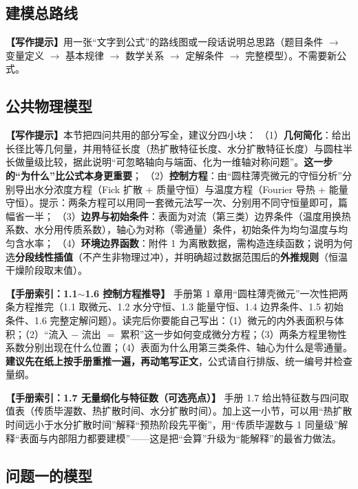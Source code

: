 \documentclass[12pt,a4paper]{article}
\newcommand{\prompt}[1]{\par\noindent\textbf{【写作提示】}#1\par}      %
\newcommand{\handbook}[2]{\par\noindent\textbf{【手册索引：#1】} #2\par}
\begin{document}
\subsection{建模总路线}

\prompt{用一张“文字到公式”的路线图或一段话说明总思路（题目条件 $\rightarrow$ 变量定义 $\rightarrow$ 基本规律 $\rightarrow$ 数学关系 $\rightarrow$ 定解条件 $\rightarrow$ 完整模型）。不需要新公式。}

\subsection{公共物理模型}

\prompt{本节把四问共用的部分写全，建议分四小块：
（1）\textbf{几何简化}：给出长径比等几何量，并用特征长度（热扩散特征长度、水分扩散特征长度）与圆柱半长做量级比较，据此说明“可忽略轴向与端面、化为一维轴对称问题”。\textbf{这一步的“为什么”比公式本身更重要}；
（2）\textbf{控制方程}：由“圆柱薄壳微元的守恒分析”分别导出水分浓度方程（Fick 扩散 + 质量守恒）与温度方程（Fourier 导热 + 能量守恒）。提示：两条方程可以用同一套微元法写一次、分别用不同守恒量即可，篇幅省一半；
（3）\textbf{边界与初始条件}：表面为对流（第三类）边界条件（温度用换热系数、水分用传质系数），轴心为对称（零通量）条件，初始条件为均匀温度与均匀含水率；
（4）\textbf{环境边界函数}：附件 1 为离散数据，需构造连续函数；说明为何选\textbf{分段线性插值}（不产生非物理过冲），并明确超过数据范围后的\textbf{外推规则}（恒温干燥阶段取末值）。}
\handbook{1.1$\sim$1.6 控制方程推导}{手册第 1 章用“圆柱薄壳微元”一次性把两条方程推完（1.1 取微元、1.2 水分守恒、1.3 能量守恒、1.4 边界条件、1.5 初始条件、1.6 完整定解问题）。读完后你要能自己写出：（1）微元的内外表面积与体积；（2）“流入 $-$ 流出 $=$ 累积”这一步如何变成微分方程；（3）两条方程里物性系数分别出现在什么位置；（4）表面为什么用第三类条件、轴心为什么是零通量。\textbf{建议先在纸上按手册重推一遍，再动笔写正文}，公式请自行排版、统一编号并检查量纲。}

\handbook{1.7 无量纲化与特征数（可选亮点）}{手册 1.7 给出特征数与四问取值表（传质毕渥数、热扩散时间、水分扩散时间）。加上这一小节，可以用“热扩散时间远小于水分扩散时间”解释“预热阶段先平衡”，用“传质毕渥数与 1 同量级”解释“表面与内部阻力都要建模”——这是把“会算”升级为“能解释”的最省力做法。}


\subsection{问题一的模型}
\end{document}
